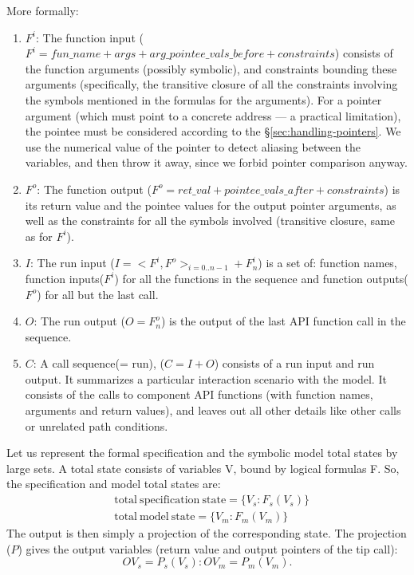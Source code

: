 \documentclass[letterpaper,twocolumn,10pt]{article}
\begin{document}
More formally:
\begin{enumerate}
\item \(F^i\): The function input (\(F^i = fun\_name + args +
  arg\_pointee\_vals\_before + constraints\)) consists of the function arguments
  (possibly symbolic), and constraints bounding these arguments (specifically,
  the transitive closure of all the constraints involving the symbols mentioned
  in the formulas for the arguments). For a pointer argument (which must point
  to a concrete address --- a practical limitation), the pointee must be
  considered according to the \S\ref{sec:handling-pointers}. We use the
  numerical value of the pointer to detect aliasing between the variables, and
  then throw it away, since we forbid pointer comparison anyway.
\item \(F^o\): The function output (\(F^o = ret\_val + pointee\_vals\_after +
  constraints\)) is its return value and the pointee values for the output
  pointer arguments, as well as the constraints for all the symbols involved
  (transitive closure, same as for \(F^i\)).
\item \(I\): The run input (\(I = <F^i,F^o>_{i=0..n-1} + F^i_n\)) is a set of:
  function names, function inputs(\(F^i\)) for all the functions in the sequence
  and function outputs(\(F^o\)) for all but the last call.
\item \(O\): The run output (\(O = F^o_n\)) is the output of the last API
  function call in the sequence.
\item \(C\): A call sequence(= run), (\(C=I+O\)) consists of a run input and
  run output. It summarizes a particular interaction scenario with the model. It
  consists of the calls to component API functions (with function names,
  arguments and return values), and leaves out all other details like other
  calls or unrelated path conditions.
\end{enumerate}

Let us represent the formal specification and the symbolic model total states by
large sets. A total state consists of variables V, bound by logical formulas F.
So, the specification and model total states are:
\[
  \begin{aligned}
  &\mathrm{total~specification~state} = \{V_s : F_s(V_s)\}\\
  &\mathrm{total~model~state} = \{V_m : F_m(V_m)\}
  \end{aligned}
\]
The output is then simply a projection of the corresponding state. The
projection (\(P\)) gives the output variables (return value and output pointers of
the tip call):
\[
OV_s = P_s(V_s): OV_m = P_m(V_m).
\]
\end{document}
